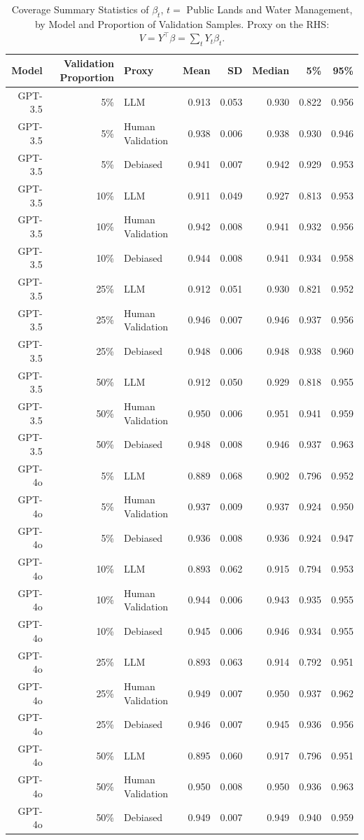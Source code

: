 \begin{table}

\caption{\label{tab:unnamed-chunk-1}Coverage Summary Statistics of $\beta_{t}$, $t=$ Public Lands and Water Management, by Model and Proportion of Validation Samples.
      Proxy on the RHS: $V = Y^\top \beta = \sum_{t} Y_t \beta_t$.}
\centering
\begin{tabular}[t]{rrlrrrrr}
\toprule
Model & Validation Proportion & Proxy & Mean & SD & Median & 5\% & 95\%\\
\midrule
GPT-3.5 & 5\% & LLM & 0.913 & 0.053 & 0.930 & 0.822 & 0.956\\
GPT-3.5 & 5\% & Human Validation & 0.938 & 0.006 & 0.938 & 0.930 & 0.946\\
GPT-3.5 & 5\% & Debiased & 0.941 & 0.007 & 0.942 & 0.929 & 0.953\\
GPT-3.5 & 10\% & LLM & 0.911 & 0.049 & 0.927 & 0.813 & 0.953\\
GPT-3.5 & 10\% & Human Validation & 0.942 & 0.008 & 0.941 & 0.932 & 0.956\\
GPT-3.5 & 10\% & Debiased & 0.944 & 0.008 & 0.941 & 0.934 & 0.958\\
GPT-3.5 & 25\% & LLM & 0.912 & 0.051 & 0.930 & 0.821 & 0.952\\
GPT-3.5 & 25\% & Human Validation & 0.946 & 0.007 & 0.946 & 0.937 & 0.956\\
GPT-3.5 & 25\% & Debiased & 0.948 & 0.006 & 0.948 & 0.938 & 0.960\\
GPT-3.5 & 50\% & LLM & 0.912 & 0.050 & 0.929 & 0.818 & 0.955\\
GPT-3.5 & 50\% & Human Validation & 0.950 & 0.006 & 0.951 & 0.941 & 0.959\\
GPT-3.5 & 50\% & Debiased & 0.948 & 0.008 & 0.946 & 0.937 & 0.963\\
GPT-4o & 5\% & LLM & 0.889 & 0.068 & 0.902 & 0.796 & 0.952\\
GPT-4o & 5\% & Human Validation & 0.937 & 0.009 & 0.937 & 0.924 & 0.950\\
GPT-4o & 5\% & Debiased & 0.936 & 0.008 & 0.936 & 0.924 & 0.947\\
GPT-4o & 10\% & LLM & 0.893 & 0.062 & 0.915 & 0.794 & 0.953\\
GPT-4o & 10\% & Human Validation & 0.944 & 0.006 & 0.943 & 0.935 & 0.955\\
GPT-4o & 10\% & Debiased & 0.945 & 0.006 & 0.946 & 0.934 & 0.955\\
GPT-4o & 25\% & LLM & 0.893 & 0.063 & 0.914 & 0.792 & 0.951\\
GPT-4o & 25\% & Human Validation & 0.949 & 0.007 & 0.950 & 0.937 & 0.962\\
GPT-4o & 25\% & Debiased & 0.946 & 0.007 & 0.945 & 0.936 & 0.956\\
GPT-4o & 50\% & LLM & 0.895 & 0.060 & 0.917 & 0.796 & 0.951\\
GPT-4o & 50\% & Human Validation & 0.950 & 0.008 & 0.950 & 0.936 & 0.963\\
GPT-4o & 50\% & Debiased & 0.949 & 0.007 & 0.949 & 0.940 & 0.959\\
\bottomrule
\end{tabular}
\end{table}
